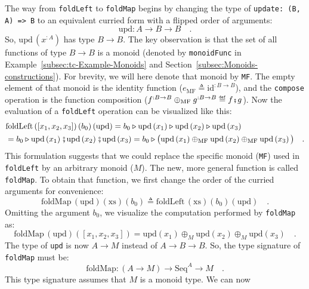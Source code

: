 The way from \lstinline!foldLeft! to \lstinline!foldMap! begins
by changing the type of \lstinline!update: (B, A) => B! to an equivalent
curried form with a flipped order of arguments:
\[
\text{upd}:A\rightarrow B\rightarrow B\quad.
\]
So, $\text{upd}\,(x^{:A})$ has type $B\rightarrow B$. The key observation
is that the set of all functions of type $B\rightarrow B$ is a monoid
(denoted by \lstinline!monoidFunc! in Example~\ref{subsec:tc-Example-Monoids}
and Section~\ref{subsec:Monoids-constructions}).
For brevity, we will here denote that monoid by \lstinline!MF!. The
empty element of that monoid is the identity function ($e_{\text{MF}}\triangleq\text{id}^{:B\rightarrow B}$),
and the \lstinline!compose! operation is the function composition
($f^{:B\rightarrow B}\oplus_{\text{MF}}g^{:B\rightarrow B}\triangleq f\bef g$).
Now the evaluation of a \lstinline!foldLeft! operation can be visualized
like this:
\begin{align*}
 & \text{foldLeft}\left(\left[x_{1},x_{2},x_{3}\right]\right)\left(b_{0}\right)\left(\text{upd}\right)=b_{0}\triangleright\text{upd}\left(x_{1}\right)\triangleright\text{upd}\left(x_{2}\right)\triangleright\text{upd}\left(x_{3}\right)\\
 & =b_{0}\triangleright\text{upd}\left(x_{1}\right)\bef\text{upd}\left(x_{2}\right)\bef\text{upd}\left(x_{3}\right)=b_{0}\triangleright\big(\text{upd}\left(x_{1}\right)\oplus_{\text{MF}}\text{upd}\left(x_{2}\right)\oplus_{\text{MF}}\text{upd}\left(x_{3}\right)\big)\quad.
\end{align*}
This formulation suggests that we could replace the specific monoid
(\lstinline!MF!) used in \lstinline!foldLeft! by an arbitrary monoid
($M$). The new, more general function is called \lstinline!foldMap!.
To obtain that function, we first change the order of the curried
arguments for convenience:
\[
\text{foldMap}\,(\text{upd})(\text{xs})\left(b_{0}\right)\triangleq\text{foldLeft}\,(\text{xs})\left(b_{0}\right)(\text{upd})\quad.
\]
Omitting the argument $b_{0}$, we visualize the computation performed
by \lstinline!foldMap! as:
\[
\text{foldMap}\,(\text{upd})\left(\left[x_{1},x_{2},x_{3}\right]\right)=\text{upd}\left(x_{1}\right)\oplus_{M}\text{upd}\left(x_{2}\right)\oplus_{M}\text{upd}\left(x_{3}\right)\quad.
\]
The type of \lstinline!upd! is now $A\rightarrow M$ instead of $A\rightarrow B\rightarrow B$.
So, the type signature of \lstinline!foldMap! must be:
\[
\text{foldMap}:(A\rightarrow M)\rightarrow\text{Seq}^{A}\rightarrow M\quad.
\]
This type signature assumes that $M$ is a monoid type. We can now
